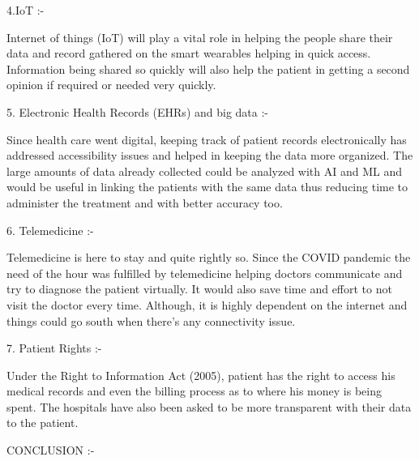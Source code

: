 \documentclass[12pt]{article}
\begin{document}
\linebreak
\linebreak
\begin{Large}
4.IoT :-
\end{Large}
Internet of things (IoT) will play a vital role in helping the people share their data and record gathered on the smart wearables helping in quick access. Information being shared so quickly will also help the patient in getting a second opinion if required or needed very quickly.
\linebreak
\linebreak
\clearpage


\begin{Large}
5. Electronic Health Records (EHRs) and big data :-
\end{Large}
Since health care went digital, keeping track of patient records electronically has addressed accessibility issues and helped in keeping the data more organized. The large amounts of data already collected could be analyzed with AI and ML and would be useful in linking the patients with the same data thus reducing time to administer the treatment and with better accuracy too.
\linebreak
\linebreak
\begin{Large}
6. Telemedicine :-
\end{Large}
\linebreak
Telemedicine is here to stay and quite rightly so. Since the COVID pandemic the need of the hour was fulfilled by telemedicine helping doctors communicate and try to diagnose the patient virtually. It would also save time and effort to not visit the doctor every time. Although, it is highly dependent on the internet and things could go south when there's any connectivity issue.
\linebreak
\linebreak
\begin{Large}
7. Patient Rights :-
\linebreak
\end{Large}
Under the Right to Information Act (2005), patient has the right to access his medical records and even the billing process as to where his money is being spent. The hospitals have also been asked to be more transparent with their data to the patient.
\linebreak
\linebreak
\begin{LARGE}
CONCLUSION :-
\end{LARGE}
\end{document}
